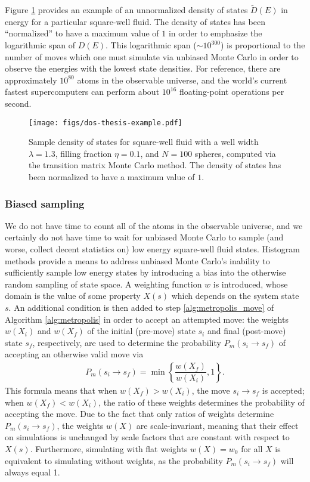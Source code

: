 \documentclass[11pt]{article}
\newcommand{\f}[2]{\dfrac{#1}{#2}} %
\newcommand{\p}[1]{\left(#1\right)} %
\renewcommand{\set}[1]{\left\{#1\right\}} %
\begin{document}
Figure \ref{fig:dos_sample} provides an example of an unnormalized
density of states $\tilde D\p{E}$ in energy for a particular
square-well fluid. The density of states has been ``normalized'' to
have a maximum value of $1$ in order to emphasize the logarithmic span
of $D\p{E}$. This logarithmic span ($\sim10^{300}$) is proportional to
the number of moves which one must simulate via unbiased Monte Carlo
in order to observe the energies with the lowest state densities. For
reference, there are approximately $10^{80}$ atoms in the observable
universe, and the world's current fastest supercomputers can perform
about $10^{16}$ floating-point operations per second.

\begin{figure}
  \centering
  \texttt{[image: figs/dos-thesis-example.pdf]}
  \caption[Density of states]
  {Sample density of states for square-well fluid with a well width
    $\lambda=1.3$, filling fraction $\eta=0.1$, and $N=100$ spheres,
    computed via the transition matrix Monte Carlo method. The density
    of states has been normalized to have a maximum value of $1$.}
  \label{fig:dos_sample}
\end{figure}

\subsubsection{Biased sampling}
\label{sec:biased_sampling}

We do not have time to count all of the atoms in the observable
universe, and we certainly do not have time to wait for unbiased Monte
Carlo to sample (and worse, collect decent statistics on) low energy
square-well fluid states. Histogram methods provide a means to address
unbiased Monte Carlo's inability to sufficiently sample low energy
states by introducing a bias into the otherwise random sampling of
state space. A weighting function $w$ is introduced, whose domain is
the value of some property $X\p{s}$ which depends on the system state
$s$. An additional condition is then added to step
\ref{alg:metropolis_move} of Algorithm \ref{alg:metropolis} in order
to accept an attempted move: the weights $w\p{X_i}$ and $w\p{X_f}$ of
the initial (pre-move) state $s_i$ and final (post-move) state $s_f$,
respectively, are used to determine the probability $P_m\p{s_i\to
  s_f}$ of accepting an otherwise valid move via
\begin{align}
  P_m\p{s_i\to s_f}=\min\set{\f{w\p{X_f}}{w\p{X_i}},1}.
  \label{eq:move_prob}
\end{align}
This formula means that when $w\p{X_f}>w\p{X_i}$, the move $s_i\to
s_f$ is accepted; when $w\p{X_f}<w\p{X_i}$, the ratio of these weights
determines the probability of accepting the move. Due to the fact that
only ratios of weights determine $P_m\p{s_i\to s_f}$, the weights
$w\p{X}$ are scale-invariant, meaning that their effect on simulations
is unchanged by scale factors that are constant with respect to
$X\p{s}$. Furthermore, simulating with flat weights $w\p{X}=w_0$ for
all $X$ is equivalent to simulating without weights, as the
probability $P_m\p{s_i\to s_f}$ will always equal 1.
\end{document}
